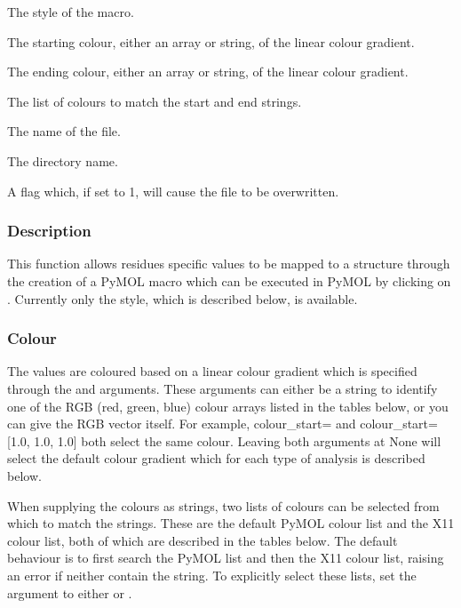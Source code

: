    The style of the macro.   

   The starting colour, either an array or string, of the linear colour gradient.   

   The ending colour, either an array or string, of the linear colour gradient.   

   The list of colours to match the start and end strings.   

   The name of the file.   

   The directory name.   

   A flag which, if set to 1, will cause the file to be overwritten.  

  

  
 \subsubsection{Description} 

 This function allows residues specific values to be mapped to a structure through the creation of a PyMOL macro which can be executed in PyMOL by clicking on .  Currently only the  style, which is described below, is available. 
  

  
 \subsubsection{Colour} 

 The values are coloured based on a linear colour gradient which is specified through the  and  arguments.  These arguments can either be a string to identify one of the RGB (red, green, blue) colour arrays listed in the tables below, or you can give the RGB vector itself.  For example, colour\_start= and colour\_start=[1.0, 1.0, 1.0] both select the same colour.  Leaving both arguments at None will select the default colour gradient which for each type of analysis is described below. 
  

 When supplying the colours as strings, two lists of colours can be selected from which to match the strings.  These are the default PyMOL colour list and the X11 colour list, both of which are described in the tables below.  The default behaviour is to first search the PyMOL list and then the X11 colour list, raising an error if neither contain the string. To explicitly select these lists, set the  argument to either  or . 
  

